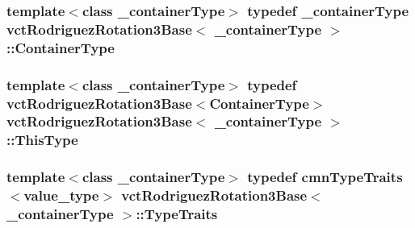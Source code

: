 \subsubsection[{Container\+Type}]{\setlength{\rightskip}{0pt plus 5cm}template$<$class \+\_\+container\+Type$>$ typedef \+\_\+container\+Type {\bf vct\+Rodriguez\+Rotation3\+Base}$<$ \+\_\+container\+Type $>$\+::{\bf Container\+Type}}\label{classvct_rodriguez_rotation3_base_a121aa7d7f143b0c59ef190ff9bff57d2}
\hypertarget{classvct_rodriguez_rotation3_base_add2bccab7f6e86c98b3f97fd00b06dcc}{}
\subsubsection[{This\+Type}]{\setlength{\rightskip}{0pt plus 5cm}template$<$class \+\_\+container\+Type$>$ typedef {\bf vct\+Rodriguez\+Rotation3\+Base}$<${\bf Container\+Type}$>$ {\bf vct\+Rodriguez\+Rotation3\+Base}$<$ \+\_\+container\+Type $>$\+::{\bf This\+Type}}\label{classvct_rodriguez_rotation3_base_add2bccab7f6e86c98b3f97fd00b06dcc}
\hypertarget{classvct_rodriguez_rotation3_base_a862714ccf1a5b0f77a49e7983204474f}{}
\subsubsection[{Type\+Traits}]{\setlength{\rightskip}{0pt plus 5cm}template$<$class \+\_\+container\+Type$>$ typedef {\bf cmn\+Type\+Traits}$<$value\+\_\+type$>$ {\bf vct\+Rodriguez\+Rotation3\+Base}$<$ \+\_\+container\+Type $>$\+::{\bf Type\+Traits}}\label{classvct_rodriguez_rotation3_base_a862714ccf1a5b0f77a49e7983204474f}


